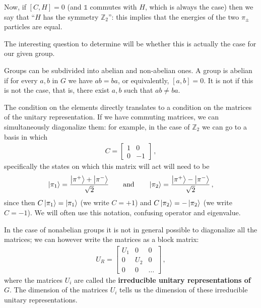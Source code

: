 \documentclass[main.tex]{subfiles}
\begin{document}
Now, if \([C, H] =0\) (and \(\mathbb{1}\) commutes with \(H\), which is always the case) then we say that ``\(H\) has the symmetry \(\mathbb{Z}_{2}\)'': this implies that the energies of the two \(\pi_{\pm}\) particles are equal.

The interesting question to determine will be whether this is actually the case for our given group. 

Groups can be subdivided into abelian and non-abelian ones.
A group is abelian if for every \(a, b\) in \(G\) we have \(ab = ba\), or equivalently, \([a, b] =0\). 
It is not if this is not the case, that is, there exist \(a, b\) such that \(ab \neq ba\).

The condition on the elements directly translates to a condition on the matrices of the unitary representation. 
If we have commuting matrices, we can simultaneously diagonalize them: for example, in the case of \(\mathbb{Z}_{2}\) we can go to a basis in which 
%
\begin{subequations}
\begin{align}
C = \left[\begin{array}{cc}
1 & 0 \\ 
0 & -1
\end{array}\right]
\,,
\end{align}
\end{subequations}
%
specifically the states on which this matrix will act will need to be 
%
\begin{align}
\ket{\pi_{1}} = \frac{\ket{\pi^{+}} + \ket{\pi^{-}}}{\sqrt{2}} 
\qquad \text{and} \qquad
\ket{\pi_{2}} = \frac{\ket{\pi^{+}} - \ket{\pi^{-}}}{\sqrt{2}}
\,,
\end{align}
%
since then \(C \ket{\pi_1 } = \ket{\pi_1 }\) (we write \(C = +1\)) and \(C \ket{\pi_{2}} = - \ket{\pi_2 }\) (we write \(C = -1\)). 
We will often use this notation, confusing operator and eigenvalue.

In the case of nonabelian groups it is not in general possible to diagonalize all the matrices; we can however write the matrices as a block matrix: 
%
\begin{subequations}
\begin{align}
U_{R} = \left[\begin{array}{ccc}
U_1  & 0 & 0 \\ 
0 & U_2  & 0 \\ 
0 & 0 & \dots
\end{array}\right] 
\,,
\end{align}
\end{subequations}
%
where the matrices \(U_i\) are called the \textbf{irreducible unitary representations of \(G\)}. The dimension of the matrices \(U_i\) tells us the dimension of these irreducible unitary representations.
\end{document}
